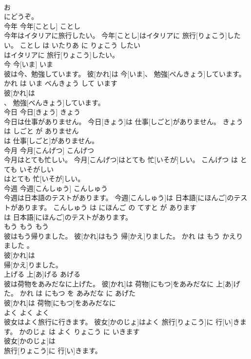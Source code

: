\documentclass[8pt]{extreport}
\begin{document}
\begin{CJK}{UTF8}{min}
\\	お
\\	にどうぞ。			
\\	今年	今年[ことし]	ことし	
\\	今年はイタリアに旅行したい。	今年[ことし]はイタリアに 旅行[りょこう]したい。	ことし は いたりあ に りょこう したい	
\\	はイタリアに 旅行[りょこう]したい。			
\\	今	今[いま]	いま	
\\	彼は今、勉強しています。	彼[かれ]は 今[いま]、 勉強[べんきょう]しています。	かれ は いま べんきょう して います	
\\	彼[かれ]は
\\	、 勉強[べんきょう]しています。			
\\	今日	今日[きょう]	きょう	
\\	今日は仕事がありません。	今日[きょう]は 仕事[しごと]がありません。	きょう は しごと が ありません	
\\	は 仕事[しごと]がありません。			
\\	今月	今月[こんげつ]	こんげつ	
\\	今月はとても忙しい。	今月[こんげつ]はとても 忙[いそが]しい。	こんげつ は とても いそがしい	
\\	はとても 忙[いそが]しい。			
\\	今週	今週[こんしゅう]	こんしゅう	
\\	今週は日本語のテストがあります。	今週[こんしゅう]は 日本語[にほんご]のテストがあります。	こんしゅう は にほんご の てすと が あります	
\\	は 日本語[にほんご]のテストがあります。			
\\	もう	もう	もう	
\\	彼はもう帰りました。	彼[かれ]はもう 帰[かえ]りました。	かれ は もう かえりました 。	
\\	彼[かれ]は
\\	帰[かえ]りました。			
\\	上げる	上[あ]げる	あげる	
\\	彼は荷物をあみだなに上げた。	彼[かれ]は 荷物[にもつ]をあみだなに 上[あ]げた。	かれ は にもつ を あみだな に あげた	
\\	彼[かれ]は 荷物[にもつ]をあみだなに
\\	よく	よく	よく	
\\	彼女はよく旅行に行きます。	彼女[かのじょ]はよく 旅行[りょこう]に 行[い]きます。	かのじょ は よく りょこう に いきます	
\\	彼女[かのじょ]は
\\	旅行[りょこう]に 行[い]きます。			

\end{CJK}
\end{document}
